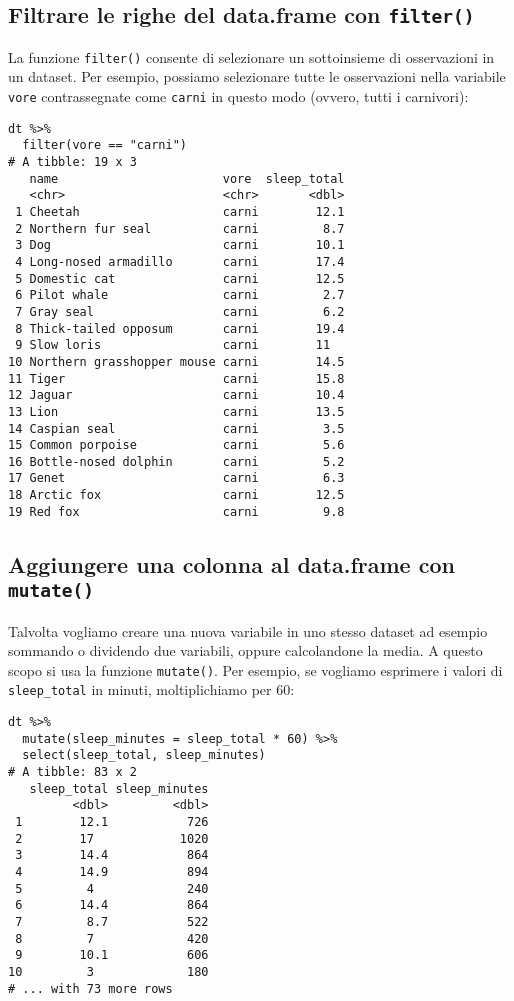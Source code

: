 \subsection{Filtrare le righe del data.frame con \texttt{filter()}}

La funzione \verb+filter()+ consente di selezionare un sottoinsieme di osservazioni in un dataset. 
Per esempio, possiamo selezionare tutte le osservazioni nella variabile  \verb+vore+ contrassegnate come \verb+carni+ in questo modo (ovvero, tutti i carnivori):
\begin{lstlisting}
dt %>%
  filter(vore == "carni")
# A tibble: 19 x 3
   name                       vore  sleep_total
   <chr>                      <chr>       <dbl>
 1 Cheetah                    carni        12.1
 2 Northern fur seal          carni         8.7
 3 Dog                        carni        10.1
 4 Long-nosed armadillo       carni        17.4
 5 Domestic cat               carni        12.5
 6 Pilot whale                carni         2.7
 7 Gray seal                  carni         6.2
 8 Thick-tailed opposum       carni        19.4
 9 Slow loris                 carni        11  
10 Northern grasshopper mouse carni        14.5
11 Tiger                      carni        15.8
12 Jaguar                     carni        10.4
13 Lion                       carni        13.5
14 Caspian seal               carni         3.5
15 Common porpoise            carni         5.6
16 Bottle-nosed dolphin       carni         5.2
17 Genet                      carni         6.3
18 Arctic fox                 carni        12.5
19 Red fox                    carni         9.8
\end{lstlisting}


\subsection{Aggiungere una colonna al data.frame con \texttt{mutate()}}

Talvolta vogliamo creare una nuova variabile in uno stesso dataset ad esempio sommando o dividendo due variabili, oppure calcolandone la media. 
A questo scopo si usa la funzione \verb+mutate()+. 
Per esempio, se vogliamo esprimere i valori di \verb+sleep_total+ in minuti, moltiplichiamo per 60:
\begin{lstlisting}
dt %>% 
  mutate(sleep_minutes = sleep_total * 60) %>%
  select(sleep_total, sleep_minutes)
# A tibble: 83 x 2
   sleep_total sleep_minutes
         <dbl>         <dbl>
 1        12.1           726
 2        17            1020
 3        14.4           864
 4        14.9           894
 5         4             240
 6        14.4           864
 7         8.7           522
 8         7             420
 9        10.1           606
10         3             180
# ... with 73 more rows
\end{lstlisting}


